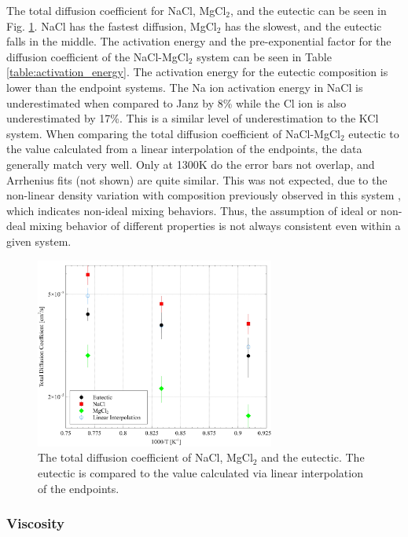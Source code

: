 \documentclass[review]{elsarticle}
\begin{document}
The total diffusion coefficient for NaCl, MgCl$_2$, and the eutectic can be seen in Fig. \ref{fig:NaMgCl_total_diff}. NaCl has the fastest diffusion, MgCl$_2$ has the slowest, and the eutectic falls in the middle.
The activation energy and the pre-exponential factor for the diffusion coefficient of the NaCl-MgCl$_2$ system can be seen in Table \ref{table:activation_energy}. The activation energy for the eutectic composition is lower than the endpoint systems. The Na ion activation energy in NaCl is underestimated when compared to Janz \cite{janz_Diffusion} by 8\% while the Cl ion is also underestimated by 17\%. This is a similar level of underestimation to the KCl system. When comparing the total diffusion coefficient of NaCl-MgCl$_2$ eutectic to the value calculated from a linear interpolation of the endpoints, the data generally match very well. Only at 1300K do the error bars not overlap, and Arrhenius fits (not shown) are quite similar. This was not expected, due to the non-linear density variation with composition previously observed in this system \cite{duemmler_naclmgcl}, which indicates non-ideal mixing behaviors. Thus, the assumption of ideal or non-deal mixing behavior of different properties is not always consistent even within a given system. 

\begin{figure}[!h]
 \centering
 \includegraphics[width=0.7\textwidth]{diff_total_namgcl.jpg} 
 \caption{The total diffusion coefficient of NaCl, MgCl$_2$ and the eutectic. The eutectic is compared to the value calculated via linear interpolation of the endpoints.}
 \label{fig:NaMgCl_total_diff}
\end{figure}
\FloatBarrier



\subsubsection{Viscosity}
\end{document}
